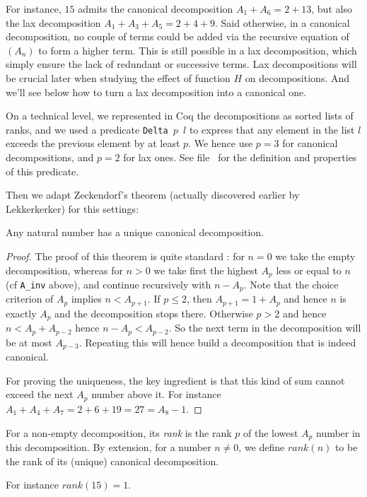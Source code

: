 \documentclass[a4paper,11pt]{article}
\begin{document}
For instance, $15$ admits the canonical decomposition
$A_1+A_6 = 2 + 13$, but also the lax decomposition $A_1+A_3+A_5
= 2 + 4 + 9$.
Said otherwise, in a canonical decomposition, no couple of terms could
be added via the recursive equation of $(A_n)$ to form a higher term.
This is still possible in a lax decomposition, which simply ensure
the lack of redundant or successive terms. Lax decompositions will
be crucial later when studying the effect of function $H$ on
decompositions. And we'll see below how to turn a lax
decomposition into a canonical one.

On a technical level, we represented in Coq the decompositions
as sorted lists of ranks, and we used a predicate {\tt Delta $p$ $l$}
to express that any element in the list $l$ exceeds the previous
element by at least $p$. We hence use $p=3$ for canonical
decompositions, and $p=2$ for lax ones. See file
\ for the definition and properties of this
predicate.

Then we adapt Zeckendorf's theorem (actually discovered earlier by
Lekkerkerker) for this settings:

\begin{theorem}[Zeckendorf]\label{zeck}
Any natural number has a unique canonical decomposition.
\end{theorem}

\begin{proof}
The proof of this theorem is quite standard : for $n=0$ we take
the empty decomposition, whereas for
$n>0$ we take first the highest $A_p$ less or equal to $n$
(cf {\tt A\_inv} above),
and continue recursively with $n-A_p$.
Note that the choice criterion of $A_p$ implies $n < A_{p+1}$.
If $p\le 2$, then $A_{p+1} = 1 + A_p$ and hence $n$ is exactly $A_p$
and the decomposition stops there. Otherwise $p>2$ and
hence $n < A_p + A_{p-2}$ hence $n-A_p < A_{p-2}$. So the next term in
the decomposition will be at most $A_{p-3}$. Repeating this will hence
build a decomposition that is indeed canonical.

For proving the uniqueness, the key ingredient is that this kind of
sum cannot exceed the next $A_p$ number above it. For instance
$A_1+A_4+A_7 = 2+6+19 = 27 = A_8 - 1$.
\end{proof}

\begin{definition}
For a non-empty decomposition, its \emph{rank} is the rank $p$ of
the lowest $A_p$ number in this decomposition. By extension, for a
number $n\neq 0$, we define $rank(n)$ to be the rank of its (unique)
canonical decomposition.
\end{definition}
For instance $rank(15)=1$.
\end{document}
